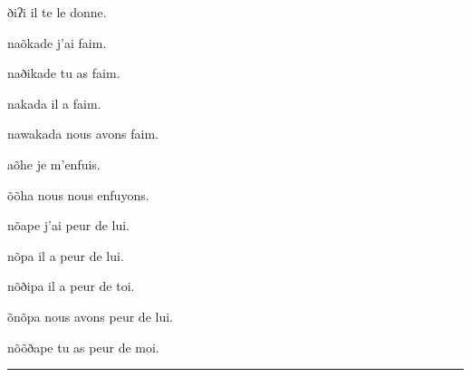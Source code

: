 \documentclass{article}
\begin{document}
\begin{multicols}{2}
 \begin{exe}
\ex \label{ex:dhii}
\glt ðiʔi
\glt il te le donne.
\end{exe} 

 \begin{exe}
\ex \label{ex:naoNkade}
\glt naõkade
\glt j'ai faim.
\end{exe} 


 \begin{exe}
\ex 
\glt naðikade
\glt tu as faim.
\end{exe} 


 \begin{exe}
\ex 
\glt nakada
\glt il a faim.
\end{exe} 

 \begin{exe}
\ex 
\glt nawakada
\glt nous avons faim.
\end{exe} 

 \begin{exe}
\ex 
\glt aõhe
\glt je m'enfuis.
\end{exe} 

 \begin{exe}
\ex 
\glt õõha
\glt nous nous enfuyons.
\end{exe} 

 \begin{exe}
\ex 
\glt nõape
\glt j'ai peur de lui.
\end{exe} 

 \begin{exe}
\ex 
\glt nõpa
\glt il a peur de lui.
\end{exe} 

 \begin{exe}
\ex 
\glt nõðipa
\glt il a peur de toi.
\end{exe} 


 \begin{exe}
\ex 
\glt õnõpa
\glt nous avons peur de lui.
\end{exe} 

 \begin{exe}
\ex \label{ex:noNpa}
\glt nõõðape
\glt tu as peur de moi.
\end{exe} 

\end{multicols}
\hrule
\end{document}
